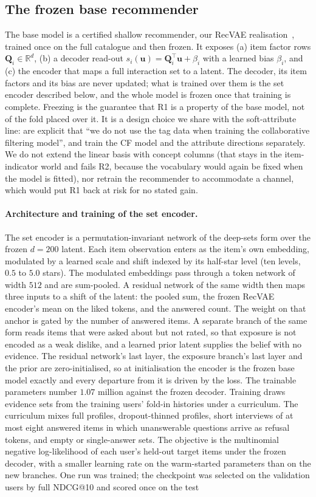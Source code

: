 \documentclass[manuscript,screen,review]{acmart}
\newcommand{\R}{\mathbb{R}}
\newcommand{\Q}{\mathbf{Q}}
\newcommand{\uu}{\mathbf{u}}
\begin{document}
\subsection{The frozen base recommender}
The base model is a certified shallow recommender, our RecVAE realisation~\citep{ren2020recvae}, trained once on the full catalogue and then frozen. It exposes (a) item factor rows $\Q_i\in\R^{d}$, (b) a decoder read-out $s_i(\uu)=\Q_i^\top\uu + \beta_i$ with a learned bias $\beta_i$, and (c) the encoder that maps a full interaction set to a latent. The decoder, its item factors and its bias are never updated; what is trained over them is the set encoder described below, and the whole model is frozen once that training is complete. Freezing is the guarantee that R1 is a property of the base model, not of the fold placed over it. It is a design choice we share with the soft-attribute line: \citet{gopfert2024cav} are explicit that ``we do not use the tag data when training the collaborative filtering model'', and \citet{biyik2023soft} train the CF model and the attribute directions separately. We do not extend the linear basis with concept columns (that stays in the item-indicator world and fails R2, because the vocabulary would again be fixed when the model is fitted), nor retrain the recommender to accommodate a channel, which would put R1 back at risk for no stated gain. \paragraph{Architecture and training of the set encoder.} The set encoder is a permutation-invariant network of the deep-sets form over the frozen $d{=}200$ latent. Each item observation enters as the item's own embedding, modulated by a learned scale and shift indexed by its half-star level (ten levels, $0.5$ to $5.0$ stars). The modulated embeddings pass through a token network of width $512$ and are sum-pooled. A residual network of the same width then maps three inputs to a shift of the latent: the pooled sum, the frozen RecVAE encoder's mean on the liked tokens, and the answered count. The weight on that anchor is gated by the number of answered items. A separate branch of the same form reads items that were asked about but not rated, so that exposure is not encoded as a weak dislike, and a learned prior latent supplies the belief with no evidence. The residual network's last layer, the exposure branch's last layer and the prior are zero-initialised, so at initialisation the encoder is the frozen base model exactly and every departure from it is driven by the loss. The trainable parameters number $1.07$ million against the frozen decoder. Training draws evidence sets from the training users' fold-in histories under a curriculum. The curriculum mixes full profiles, dropout-thinned profiles, short interviews of at most eight answered items in which unanswerable questions arrive as refusal tokens, and empty or single-answer sets. The objective is the multinomial negative log-likelihood of each user's held-out target items under the frozen decoder, with a smaller learning rate on the warm-started parameters than on the new branches. One run was trained; the checkpoint was selected on the validation users by full NDCG@10 and scored once on the test 
\end{document}
